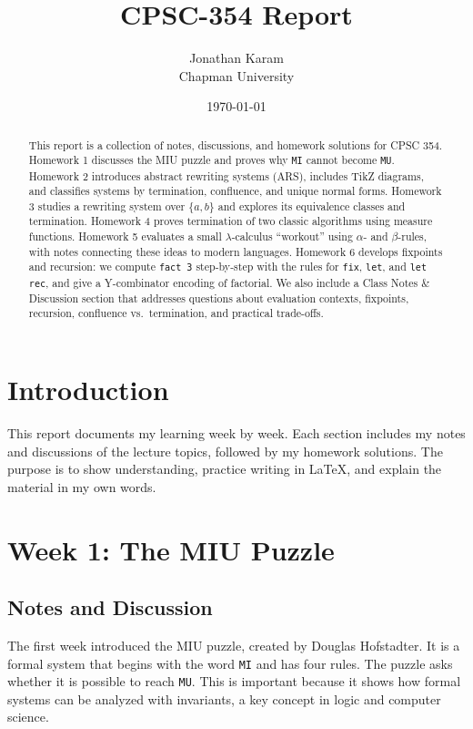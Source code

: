\documentclass{article}
\title{CPSC-354 Report}
\author{Jonathan Karam \\ Chapman University}
\date{\today}
\theoremstyle{theorem}
\theoremstyle{definition}
\theoremstyle{remark}
\begin{document}
\maketitle

\begin{abstract}
This report is a collection of notes, discussions, and homework solutions for CPSC 354. 
Homework 1 discusses the MIU puzzle and proves why \texttt{MI} cannot become \texttt{MU}. 
Homework 2 introduces abstract rewriting systems (ARS), includes TikZ diagrams, and classifies systems by termination, confluence, and unique normal forms. 
Homework 3 studies a rewriting system over $\{a,b\}$ and explores its equivalence classes and termination.
Homework 4 proves termination of two classic algorithms using measure functions.
Homework 5 evaluates a small $\lambda$-calculus ``workout'' using $\alpha$- and $\beta$-rules, with notes connecting these ideas to modern languages.
Homework 6 develops fixpoints and recursion: we compute \texttt{fact 3} step-by-step with the rules for \texttt{fix}, \texttt{let}, and \texttt{let rec}, and give a Y-combinator encoding of factorial. We also include a Class Notes \& Discussion section that addresses questions about evaluation contexts, fixpoints, recursion, confluence vs.\ termination, and practical trade-offs.
\end{abstract}

\tableofcontents

\section{Introduction}
This report documents my learning week by week. 
Each section includes my notes and discussions of the lecture topics, followed by my homework solutions.
The purpose is to show understanding, practice writing in \LaTeX{}, and explain the material in my own words.

\section{Week 1: The MIU Puzzle}

\subsection{Notes and Discussion}
The first week introduced the MIU puzzle, created by Douglas Hofstadter. 
It is a formal system that begins with the word \texttt{MI} and has four rules. 
The puzzle asks whether it is possible to reach \texttt{MU}. 
This is important because it shows how formal systems can be analyzed with invariants, a key concept in logic and computer science.
\end{document}
